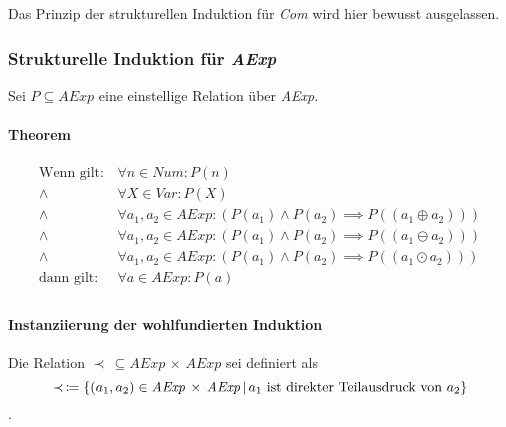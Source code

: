 				Das Prinzip der strukturellen Induktion für \textit{Com} wird hier bewusst ausgelassen.
		    
		    \subsubsection{Strukturelle Induktion für \textit{AExp}}
			    Sei $ P \subseteq \textit{AExp} $ eine einstellige Relation über \textit{AExp}.
			    
			    \paragraph{Theorem}
				    \begin{align*}
					    \text{Wenn gilt:} & \,\forall n \in \textit{Num} : P(n) \\
						\land & \,\forall X \in \textit{Var} : P(X) \\
						\land & \,\forall a _ 1, a _ 2 \in \textit{AExp} : (P(a _ 1) \land P(a _ 2) \implies P((a _ 1 \oplus a _ 2))) \\
						\land & \,\forall a _ 1, a _ 2 \in \textit{AExp} : (P(a _ 1) \land P(a _ 2) \implies P((a _ 1 \ominus a _ 2))) \\
						\land & \,\forall a _ 1, a _ 2 \in \textit{AExp} : (P(a _ 1) \land P(a _ 2) \implies P((a _ 1 \odot a _ 2))) \\
						\text{dann gilt:} & \,\forall a \in \textit{AExp} : P(a) \\
				    \end{align*}
			    
			    \paragraph{Instanziierung der wohlfundierten Induktion}

				    Die Relation $ \prec \,\subseteq \textit{AExp} \,\times\, \textit{AExp} $ sei definiert als \[ \prec \,\coloneqq \{ (a _ 1, a _ 2) \in \textit{AExp} \,\times\, \textit{AExp} \,\vert\, a _ 1 \text{ ist direkter Teilausdruck von } a _ 2 \} \].
				    
